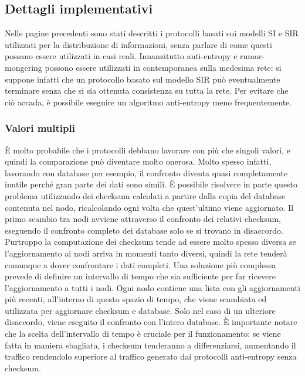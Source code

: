 \subsection{Dettagli implementativi}

Nelle pagine precedenti sono stati descritti i protocolli basati sui modelli SI e SIR utilizzati per la distribuzione di informazioni, senza parlare di come questi possano essere utilizzati in casi reali. Innanzitutto anti-entropy e rumor-mongering possono essere utilizzati in contemporanea sulla medesima rete: si suppone infatti che un protocollo basato sul modello SIR può eventualmente terminare senza che si sia ottenuta consistenza su tutta la rete. Per evitare che ciò accada, è possibile eseguire un algoritmo anti-entropy meno frequentemente.


\subsubsection{Valori multipli}

È molto probabile che i protocolli debbano lavorare con più che singoli valori, e quindi la comparazione può diventare molto onerosa. Molto spesso infatti, lavorando con database per esempio, il confronto diventa quasi completamente inutile perché gran parte dei dati sono simili. È possibile risolvere in parte questo problema utilizzando dei checksum calcolati a partire dalla copia del database contenuta nel nodo, ricalcolando ogni volta che quest’ultimo viene aggiornato. Il primo scambio tra nodi avviene attraverso il confronto dei relativi checksum, eseguendo il confronto completo dei database solo se si trovano in disaccordo. Purtroppo la computazione dei checksum tende ad essere molto spesso diversa se l’aggiornamento ai nodi arriva in momenti tanto diversi, quindi la rete tenderà comunque a dover confrontare i dati completi. Una soluzione più complessa prevede di definire un intervallo di tempo che sia sufficiente per far ricevere l’aggiornamento a tutti i nodi. Ogni nodo contiene una lista con gli aggiornamenti più recenti, all’interno di questo spazio di tempo, che viene scambiata ed utilizzata per aggiornare checksum e database. Solo nel caso di un ulteriore disaccordo, viene eseguito il confronto con l’intero database. È importante notare che la scelta dell’intervallo di tempo è cruciale per il funzionamento: se viene fatta in maniera sbagliata, i checksum tenderanno a differenziarsi, aumentando il traffico rendendolo superiore al traffico generato dai protocolli anti-entropy senza checksum.

